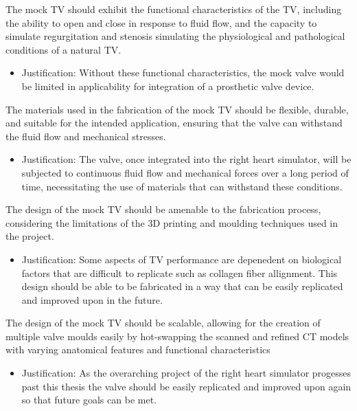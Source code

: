  The mock \gls{TV} should exhibit the functional characteristics of the \gls{TV}, including the ability to open and close in response to fluid flow, and the capacity to simulate regurgitation and stenosis simulating the physiological and pathological conditions of a natural \gls{TV}.
\begin{itemize}
    \item Justification: Without these functional characteristics, the mock valve would be limited in applicability for integration of a prosthetic valve device.
\end{itemize}

 The materials used in the fabrication of the mock \gls{TV} should be flexible, durable, and suitable for the intended application, ensuring that the valve can withstand the fluid flow and mechanical stresses.
\begin{itemize}
    \item Justification: The valve, once integrated into the right heart simulator, will be subjected to continuous fluid flow and mechanical forces over a long period of time, necessitating the use of materials that can withstand these conditions.
\end{itemize}

 The design of the mock \gls{TV} should be amenable to the fabrication process, considering the limitations of the 3D printing and moulding techniques used in the project.
\begin{itemize}
    \item Justification: Some aspects of \gls{TV} performance are depenedent on biological factors that are difficult to replicate such as collagen fiber allignment. This design should be able to be fabricated in a way that can be easily replicated and improved upon in the future.
\end{itemize}
 The design of the mock \gls{TV} should be scalable, allowing for the creation of multiple valve moulds easily by hot-swapping the scanned and refined \gls{CT} models with varying anatomical features and functional characteristics
\begin{itemize}
    \item Justification: As the overarching project of the right heart simulator progesses past this thesis the valve should be easily replicated and improved upon again so that future goals can be met.
\end{itemize}

